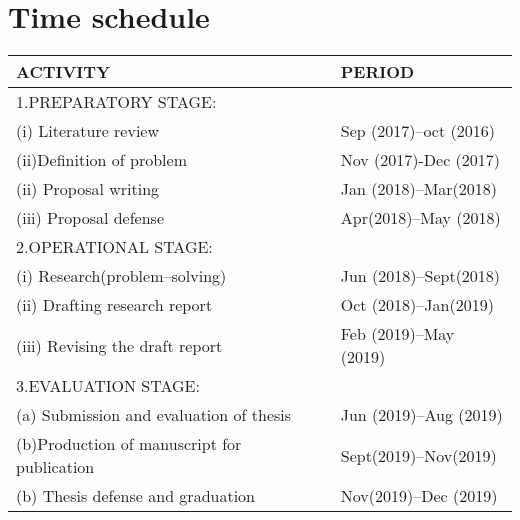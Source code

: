 \documentclass[PhD,14,a4paper]{report}
\theoremstyle{plain}
\theoremstyle{definition}
\theoremstyle{remark}
\numberwithin{figure}{section}
\numberwithin{equation}{subsection}
\begin{document}
{\begin{thebibliography}{12}
\end{thebibliography}
\newpage
\section*{Time schedule}
\begin{tabular}{|l|l|}
\hline ACTIVITY&PERIOD\\
 \hline\hline
 1.PREPARATORY STAGE:& \\
 (i) Literature review &  Sep (2017)--oct  (2016)\\
 (ii)Definition of problem& Nov (2017)-Dec (2017)\\
 (ii) Proposal writing &  Jan (2018)--Mar(2018)\\
 (iii) Proposal defense  & Apr(2018)--May (2018)\\
 \hline
 2.OPERATIONAL STAGE: & \\
   (i) Research(problem--solving) & Jun (2018)--Sept(2018)\\
   (ii) Drafting research report & Oct (2018)--Jan(2019)\\
   (iii) Revising the draft report & Feb (2019)--May (2019)\\
   \hline
 3.EVALUATION STAGE: & \\
   (a) Submission and evaluation of thesis & Jun (2019)--Aug (2019)\\
   (b)Production of manuscript for publication& Sept(2019)--Nov(2019)\\
   (b) Thesis defense and graduation    & Nov(2019)--Dec (2019)\\
 \hline
\end{tabular}

\newpage
}
\end{document}
